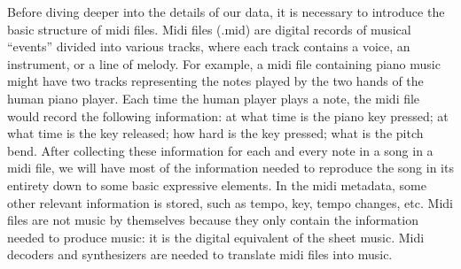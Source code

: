 \documentclass[12pt,oneside]{chicagocapstone}
\begin{document}
Before diving deeper into the details of our data, it is necessary to introduce the basic structure of midi files. Midi files (.mid) are digital records of musical ``events'' divided into various tracks, where each track contains a voice, an instrument, or a line of melody. For example, a midi file containing piano music might have two tracks representing the notes played by the two hands of the human piano player. Each time the human player plays a note, the midi file would record the following information: at what time is the piano key pressed; at what time is the key released; how hard is the key pressed; what is the pitch bend. After collecting these information for each and every note in a song in a midi file, we will have most of the information needed to reproduce the song in its entirety down to some basic expressive elements. In the midi metadata, some other relevant information is stored, such as tempo, key, tempo changes, etc. Midi files are not music by themselves because they only contain the information needed to produce music: it is the digital equivalent of the sheet music. Midi decoders and synthesizers are needed to translate midi files into music.
\end{document}
